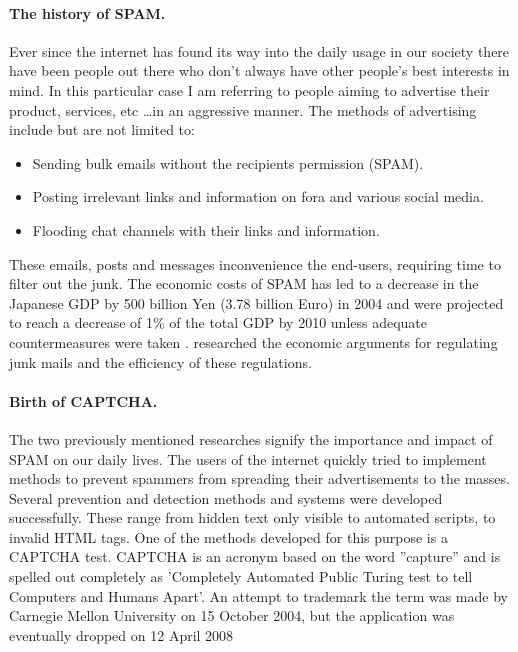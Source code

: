 \documentclass[pdftex,a4paper,12pt,twoside]{report}
\begin{document}
\paragraph{The history of SPAM.} 
Ever since the internet has found its way into the daily usage in our society there have been people out there who don't always have other people's best interests in mind. In this particular case I am referring to people aiming to advertise their product, services, etc \ldots in an aggressive manner. The methods of advertising include but are not limited to: \begin{itemize}
\item Sending bulk emails without the recipients permission (SPAM). 
\item Posting irrelevant links and information on fora and various social media.
\item Flooding chat channels with their links and information. 
\end{itemize}
These emails, posts and messages inconvenience the end-users, requiring time to filter out the junk. The economic costs of SPAM has led to a decrease in the Japanese GDP by 500 billion Yen (3.78 billion Euro) in 2004 and were projected to reach a decrease of 1\% of the total GDP by 2010 unless adequate countermeasures were taken \citep{Ukai2007}. \citep{Khong2004} researched the economic arguments for regulating junk mails and the efficiency of these regulations.
\paragraph{Birth of CAPTCHA.} 
The two previously mentioned researches signify the importance and impact of SPAM on our daily lives. The users of the internet quickly tried to implement methods to prevent spammers from spreading their advertisements to the masses. Several prevention and detection methods and systems were developed successfully. These range from hidden text only visible to automated scripts, to invalid HTML tags. One of the methods developed for this purpose is a CAPTCHA test. CAPTCHA is an acronym based on the word ''capture'' and is spelled out completely as 'Completely Automated Public Turing test to tell Computers and Humans Apart'. An attempt to trademark  the term was made by Carnegie Mellon University on 15 October 2004, but the application was eventually dropped on 12 April 2008
\end{document}
